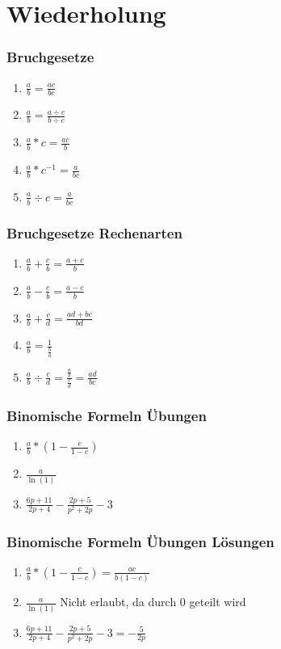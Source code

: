 \section{Wiederholung}
\begin{frame}
    \frametitle{Bruchgesetze}
    \begin{enumerate}
        \setlength\itemsep{1em}
        \item $\frac{a}{b}=\frac{ac}{bc}$
        \item $\frac{a}{b}=\frac{a \div c}{b \div c}$
        \item $\frac{a}{b}*c=\frac{ac}{b}$
        \item $\frac{a}{b}*c^{-1}=\frac{a}{bc}$
        \item $\frac{a}{b} \div c=\frac{a}{bc}$
    \end{enumerate}
\end{frame}

\begin{frame}
    \frametitle{Bruchgesetze Rechenarten}
    \begin{enumerate}
        \setlength\itemsep{1em}
        \item $\frac{a}{b} + \frac{c}{b}=\frac{a+c}{b}$
        \item $\frac{a}{b} - \frac{c}{b}=\frac{a-c}{b}$
        \item $\frac{a}{b} + \frac{c}{d}=\frac{ad+bc}{bd}$
        \item $\frac{a}{b} = \frac{1}{\frac{b}{a}}$
        \item $\frac{a}{b} \div \frac{c}{d} = \frac{\frac{a}{b}}{\frac{c}{d}} = \frac{ad}{bc}$
    \end{enumerate}
\end{frame}


\begin{frame}
    \frametitle{Binomische Formeln Übungen}
    \begin{enumerate}
        \setlength\itemsep{1em}
        \item $\frac{a}{b} * (1 - \frac{c}{1-c})$
        \item $\frac{a}{\ln(1)}$
        \item $\frac{6p + 11}{2p + 4} - \frac{2p + 5}{p^2 +2p} -3$
    \end{enumerate}
\end{frame}

\begin{frame}
    \frametitle{Binomische Formeln Übungen Lösungen}
    \begin{enumerate}
        \setlength\itemsep{1em}
        \item $\frac{a}{b} * (1 - \frac{c}{1-c}) = \frac{ac}{b(1-c)}$
        \item $\frac{a}{\ln(1)}$ Nicht erlaubt, da durch 0 geteilt wird
        \item $\frac{6p + 11}{2p + 4} - \frac{2p + 5}{p^2 +2p} -3 = -\frac{5}{2p}$
    \end{enumerate}
\end{frame}

